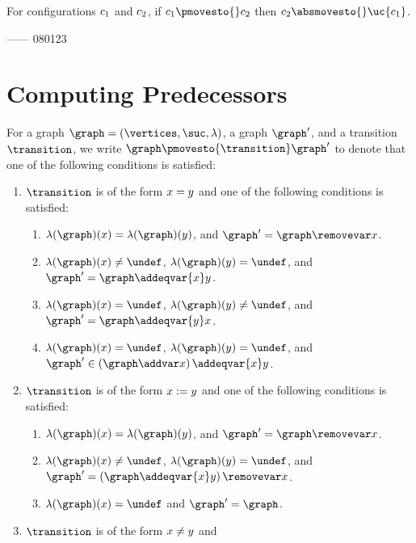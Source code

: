 \begin{lemma}
\label{backwards:implies:forwards:lemma}
For configurations $c_1$ and $c_2$, if $\conf_1\pmovesto{}\conf_2$
then $\conf_2\absmovesto{}\uc{\conf_1}$.
\end{lemma}




------
080123


\section{Computing Predecessors}

For a graph $\graph=\tuple{\vertices,\suc,\labeling}$,
a graph $\graph'$,
and a transition $\transition$,
we write $\graph\pmovesto{\transition}\graph'$ to denote that
one of the following conditions is satisfied:
\begin{enumerate}
\item
$\transition$ is of the form $x=y$ and
one of the following conditions is satisfied:
\begin{enumerate}
\item
$\labeling(\graph)(\xvar)=\labeling(\graph)(\yvar)$, and 
$\graph'=\graph\removevar\xvar$.
\item
$\labeling(\graph)(\xvar)\neq\undef$, $\labeling(\graph)(\yvar)=\undef$, and
$\graph'=\graph\addeqvar{\xvar}\yvar$.
\item
$\labeling(\graph)(\xvar)=\undef$, $\labeling(\graph)(\yvar)\neq\undef$, and
$\graph'=\graph\addeqvar{\yvar}\xvar$.
\item
$\labeling(\graph)(\xvar)=\undef$, $\labeling(\graph)(\yvar)=\undef$, and
$\graph'\in\left(\graph\addvar\xvar\right)\addeqvar{\xvar}\yvar$.
\end{enumerate}
\item
$\transition$ is of the form $x:=y$ and
one of the following conditions is satisfied:
\begin{enumerate}
\item
$\labeling(\graph)(\xvar)=\labeling(\graph)(\yvar)$, and 
$\graph'=\graph\removevar\xvar$.
\item
$\labeling(\graph)(\xvar)\neq\undef$, $\labeling(\graph)(\yvar)=\undef$,
and 
$\graph'=\left(\graph\addeqvar{\xvar}\yvar\right)\removevar\xvar$.
\item
$\labeling(\graph)(\xvar)=\undef$ and $\graph'=\graph$.
\end{enumerate}
\item
$\transition$ is of the form $x\neq y$ and

\end{enumerate}
